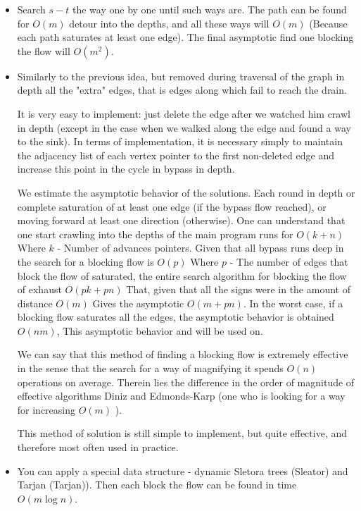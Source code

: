 \begin{itemize}

\item Search $s-t$ the way one by one until such ways are. The path can be found for $O (m)$ detour into the depths, and all these ways will $O (m)$ (Because each path saturates at least one edge). The final asymptotic find one blocking the flow will $O (m ^ 2)$.

\item Similarly to the previous idea, but removed during traversal of the graph in depth all the "extra" edges, that is edges along which fail to reach the drain.

It is very easy to implement: just delete the edge after we watched him crawl in depth (except in the case when we walked along the edge and found a way to the sink). In terms of implementation, it is necessary simply to maintain the adjacency list of each vertex pointer to the first non-deleted edge and increase this point in the cycle in bypass in depth.

We estimate the asymptotic behavior of the solutions. Each round in depth or complete saturation of at least one edge (if the bypass flow reached), or moving forward at least one direction (otherwise). One can understand that one start crawling into the depths of the main program runs for $O (k + n)$ Where $k$ - Number of advances pointers. Given that all bypass runs deep in the search for a blocking flow is $O (p)$ Where $p$ - The number of edges that block the flow of saturated, the entire search algorithm for blocking the flow of exhaust $O (p k + p n)$ That, given that all the signs were in the amount of distance $O (m)$ Gives the asymptotic $O (m + pn)$. In the worst case, if a blocking flow saturates all the edges, the asymptotic behavior is obtained $O (n m)$, This asymptotic behavior and will be used on.

We can say that this method of finding a blocking flow is extremely effective in the sense that the search for a way of magnifying it spends $O (n)$ operations on average. Therein lies the difference in the order of magnitude of effective algorithms Diniz and Edmonds-Karp (one who is looking for a way for increasing $O (m)$ ).

This method of solution is still simple to implement, but quite effective, and therefore most often used in practice.

\item You can apply a special data structure - dynamic Sletora trees (Sleator) and Tarjan (Tarjan)). Then each block the flow can be found in time $O (m \log n)$.

\end{itemize}

